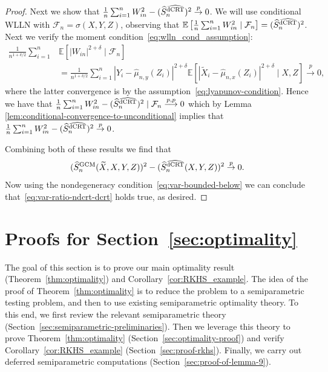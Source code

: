 \documentclass[12pt]{article}
\theoremstyle{definition}
\theoremstyle{remark}
\newcommand{\E}{\mathbb E}								%
\newcommand{\convp}{\overset p \rightarrow}             %
\newcommand{\srx}{X}									%
\newcommand{\srz}{Z}									%
\newcommand{\srxk}{\widetilde X}						%
\newcommand{\sry}{Y}									%
\newcommand{\GCM}{\textnormal{GCM}}						%
\newcommand{\dCRThat}{\widehat{\textnormal{dCRT}}}		%
\newcommand{\convpp}{\overset {p,p} \longrightarrow}    %
\begin{document}
\begin{proof}
Next we show that $\frac{1}{n} \sum_{i=1}^n W^2_{in} - (\widehat S_{n}^{\dCRThat})^2 \convp 0$. We will use conditional WLLN with $\mathcal{F}_n = \sigma(\srx,\sry,\srz)$, observing that $\E\left[\frac{1}{n} \sum_{i=1}^n W^2_{in} \mid \mathcal{F}_n\right] = (\widehat S_{n}^{\dCRThat})^2 $. Next we verify the moment condition~\eqref{eq:wlln_cond_assumption}:
\begin{align}
	\frac{1}{n^{1+\delta/2}} \sum_{i = 1}^n &\E[|W_{in}|^{2+\delta} \mid \mathcal{F}_n] \\&= \frac{1}{n^{1+\delta/2}} \sum_{i=1}^n |\sry_i-\widehat\mu_{n,y}(\srz_i)|^{2+\delta}\E\left[|\srxk_i-\widehat\mu_{n,x}(\srz_i)|^{2+\delta}\mid \srx,\srz\right] \convp 0,
\end{align} 
where the latter convergence is by the assumption~\eqref{eq:lyapunov-condition}.
Hence we have that $\frac{1}{n} \sum_{i = 1}^n W^2_{in} - (\widehat S_{n}^{\dCRThat})^2  \mid \mathcal F_n \convpp 0$ which by Lemma \ref{lem:conditional-convergence-to-unconditional} implies that $\frac{1}{n} \sum_{i=1}^n W^2_{in} - (\widehat S_{n}^{\dCRThat})^2 \convp 0$.

Combining both of these results we find that 
\begin{equation*}
(\widehat S_{n}^{\GCM}(\srxk, \srx, \sry, \srz))^2 - (\widehat S_{n}^{\dCRThat}(\srx, \sry, \srz))^2 \convp 0. 
\end{equation*}
Now using the nondegeneracy condition~\eqref{eq:var-bounded-below} we can conclude that~\eqref{eq:var-ratio-ndcrt-dcrt} holds true, as desired.
\end{proof}

\section{Proofs for Section~\ref{sec:optimality}} \label{sec:optimality-proofs}

The goal of this section is to prove our main optimality result (Theorem~\ref{thm:optimality}) and Corollary~\ref{cor:RKHS_example}. The idea of the proof of Theorem~\ref{thm:optimality} is to reduce the problem to a semiparametric testing problem, and then to use existing semiparametric optimality theory. To this end, we first review the relevant semiparametric theory (Section~\ref{sec:semiparametric-preliminaries}). Then we leverage this theory to prove Theorem~\ref{thm:optimality} (Section~\ref{sec:optimality-proof}) and verify Corollary~\ref{cor:RKHS_example} (Section~\ref{sec:proof-rkhs}). Finally, we carry out deferred semiparametric computations (Section~\ref{sec:proof-of-lemma-9}).
\end{document}
